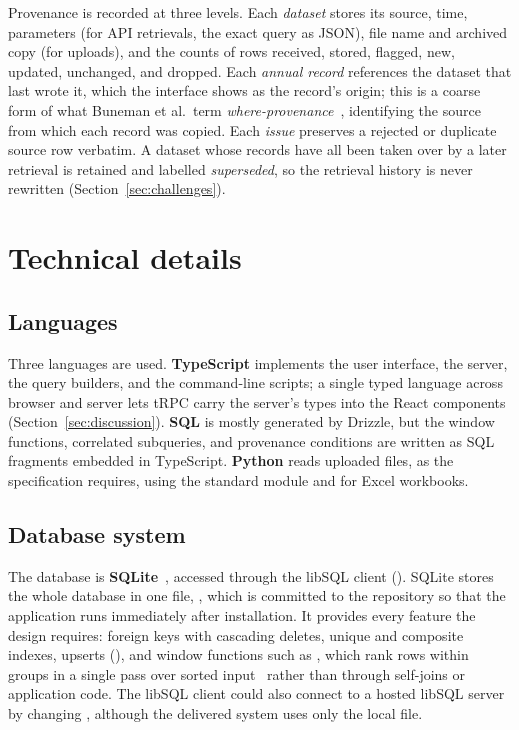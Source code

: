 \documentclass[11pt,a4paper]{article}
\begin{document}
Provenance is recorded at three levels. Each \emph{dataset} stores its source, time,
parameters (for API retrievals, the exact query as JSON), file name and archived copy (for
uploads), and the counts of rows received, stored, flagged, new, updated, unchanged, and
dropped. Each \emph{annual record} references the dataset that last wrote it, which the
interface shows as the record's origin; this is a coarse form of what Buneman et al.\ term
\emph{where-provenance}~\cite{buneman2001provenance}, identifying the source from which each
record was copied. Each \emph{issue} preserves a rejected or duplicate source row verbatim. A
dataset whose records have all been taken over by a later retrieval is retained and labelled
\emph{superseded}, so the retrieval history is never rewritten
(Section~\ref{sec:challenges}).

\section{Technical details}
\label{sec:technical}

\subsection{Languages}

Three languages are used. \textbf{TypeScript} implements the user interface, the server, the
query builders, and the command-line scripts; a single typed language across browser and
server lets tRPC carry the server's types into the React components
(Section~\ref{sec:discussion}). \textbf{SQL} is mostly generated by Drizzle, but the window
functions, correlated subqueries, and provenance conditions are written as SQL fragments
embedded in TypeScript. \textbf{Python} reads uploaded files, as the specification requires,
using the standard  module and  for Excel workbooks.

\subsection{Database system}

The database is \textbf{SQLite}~\cite{gaffney2022sqlite}, accessed through the libSQL client
(). SQLite stores the whole database in one file, , which
is committed to the repository so that the application runs immediately after installation. It
provides every feature the design requires: foreign keys with cascading deletes, unique and
composite indexes, upserts (), and window functions
such as , which rank rows within groups in a
single pass over sorted input~\cite{leis2015window} rather than through self-joins or
application code. The libSQL client could also connect to a hosted libSQL server by changing
, although the delivered system uses only the local file.
\end{document}
